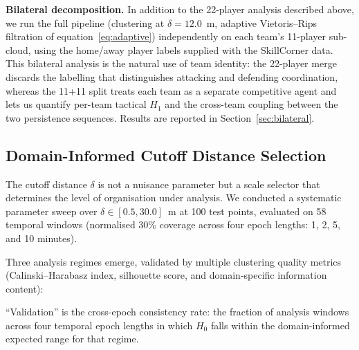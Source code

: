 \textbf{Bilateral decomposition.} In addition to the 22-player analysis described above, we run the full pipeline (clustering at \(\delta=12.0\)~m, adaptive Vietoris--Rips filtration of equation~\eqref{eq:adaptive}) independently on each team's 11-player sub-cloud, using the home/away player labels supplied with the SkillCorner data. This bilateral analysis is the natural use of team identity: the 22-player merge discards the labelling that distinguishes attacking and defending coordination, whereas the 11+11 split treats each team as a separate competitive agent and lets us quantify per-team tactical \(H_1\) and the cross-team coupling between the two persistence sequences. Results are reported in Section~\ref{sec:bilateral}.

\subsection{Domain-Informed Cutoff Distance Selection}
\label{sec:cutoff}

The cutoff distance \(\delta\) is not a nuisance parameter but a scale selector that determines the level of organisation under analysis. We conducted a systematic parameter sweep over \(\delta\in[0.5,30.0]\)~m at 100 test points, evaluated on 58 temporal windows (normalised 30\% coverage across four epoch lengths: 1, 2, 5, and 10 minutes).

Three analysis regimes emerge, validated by multiple clustering quality metrics (Calinski--Harabasz index, silhouette score, and domain-specific information content):

\begin{table}[H]
  \centering
    \caption{Validated analysis regimes from the cutoff sweep.}
    \label{tab:regimes}
    \begin{tablenotes}
      \small
      \item ``Validation'' is the cross-epoch consistency rate: the fraction of analysis windows across four temporal epoch lengths in which \(H_0\) falls within the domain-informed expected range for that regime.
    \end{tablenotes}
\end{table}

